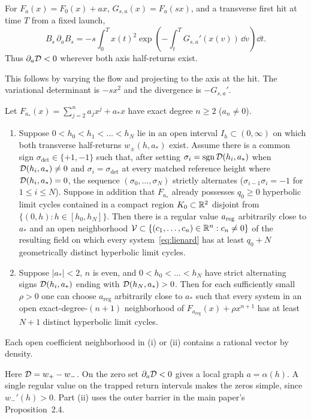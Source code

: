 \begin{lemma}\label{lem:rotational}
For $F_a(x)=F_0(x)+ax$, $G_{s,a}(x)=F_a(sx)$, and a transverse first
hit at time $T$ from a fixed launch,
\begin{equation}\label{eq:rot-half}
 B_s\,\partial_a B_s=-s\int_0^T x(t)^2
          \exp\!\left(-\int_t^T G_{s,a}'(x(v))\,\dd v\right)\dd t .
\end{equation}
Thus $\partial_a\mathcal{D}<0$ wherever both axis half-returns exist.
\end{lemma}
This follows by varying the flow and projecting to the axis at the hit.
The variational determinant is $-s x^2$ and the divergence is $-G_{s,a}'$.

\begin{proposition}\label{prop:sard}
Let $F_{a_*}(x)=\sum_{j=2}^n a_j x^j + a_* x$ have exact degree $n\ge 2$ ($a_n\neq 0$).
\begin{enumerate}
  \item[\textup{(i)}] Suppose $0<h_0<h_1<\dots<h_N$ lie in an open interval $I_h\subset(0,\infty)$ on which both transverse half-returns $w_\pm(h,a_*)$ exist. Assume there is a common sign $\sigma_{\mathrm{det}}\in\{+1,-1\}$ such that, after setting $\sigma_i=\operatorname{sgn}\mathcal{D}(h_i,a_*)$ when $\mathcal{D}(h_i,a_*)\neq 0$ and $\sigma_i=\sigma_{\mathrm{det}}$ at every matched reference height where $\mathcal{D}(h_i,a_*)=0$, the sequence $(\sigma_0,\dots,\sigma_N)$ strictly alternates ($\sigma_{i-1}\sigma_i=-1$ for $1\le i\le N$). Suppose in addition that $F_{a_*}$ already possesses $q_0\ge 0$ hyperbolic limit cycles contained in a compact region $K_0\subset\mathbb{R}^2$ disjoint from $\{(0,h):h\in[h_0,h_N]\}$. Then there is a regular value $a_{\rm reg}$ arbitrarily close to $a_*$ and an open neighborhood $\mathcal{V}\subset\{(c_1,\dots,c_n)\in\mathbb{R}^n:c_n\neq 0\}$ of the resulting field on which every system~\eqref{eq:lienard} has at least $q_0+N$ geometrically distinct hyperbolic limit cycles.
  \item[\textup{(ii)}] Suppose $|a_*|<2$, $n$ is even, and $0<h_0<\dots<h_N$ have strict alternating signs $\mathcal{D}(h_i,a_*)$ ending with $\mathcal{D}(h_N,a_*)>0$. Then for each sufficiently small $\rho>0$ one can choose $a_{\mathrm{reg}}$ arbitrarily close to $a_*$ such that every system in an open exact-degree-$(n+1)$ neighborhood of $F_{a_{\mathrm{reg}}}(x)+\rho x^{n+1}$ has at least $N+1$ distinct hyperbolic limit cycles.
\end{enumerate}
Each open coefficient neighborhood in \textup{(i)} or \textup{(ii)} contains a rational vector by density.
\end{proposition}
Here $\mathcal{D}=w_+-w_-$. On the zero set $\partial_a\mathcal{D}<0$ gives
a local graph $a=\alpha(h)$. A single regular value on the trapped
return intervals makes the zeros simple, since $w_-'(h)>0$.
Part (ii) uses the outer barrier in the main paper's Proposition~2.4.

